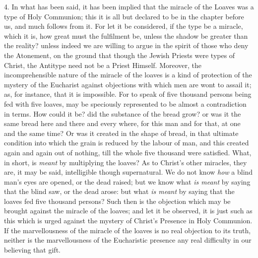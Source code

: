 4. In what has been said, it has been implied that the miracle of
the Loaves was a type of Holy Communion; this it is all but declared
to be in the chapter before us, and much follows from it. For let it
be considered, if the type be a miracle, which it is, how great must
the fulfilment be, unless the shadow be greater than the reality?
unless indeed we are willing to argue in the spirit of those who deny
the Atonement, on the ground that though the Jewish Priests were types
of Christ, the Antitype need not be a Priest Himself. Moreover, the
incomprehensible nature of the miracle of the loaves is a kind of
protection of the mystery of the Eucharist against objections with
which men are wont to assail it; as, for instance, that it is
impossible. For to speak of five thousand persons being fed with five
loaves, may be speciously represented to be almost a contradiction in
terms. How could it be? did the substance of the bread grow? or was it
the same bread here and there and every where, for this man and for
that, at one and the same time? Or was it created in the shape of
bread, in that ultimate condition into which the grain is reduced by
the labour of man, and this created again and again out of nothing,
till the whole five thousand were satisfied. What, in short, is \emph{meant}
by multiplying the loaves? As to Christ's other miracles, they are, it
may be said, intelligible though supernatural. We do not know \emph{how}
a blind man's eyes are opened, or the dead raised; but we know what \emph{is
meant} by saying that the blind saw, or the dead arose: but what \emph{is
meant} by saying that the loaves fed five thousand persons? Such
then is the objection which may be brought against the miracle of the
loaves; and let it be observed, it is just such as this which is urged
against the mystery of Christ's Presence in Holy Communion. If the
marvellousness of the miracle of the loaves is no real objection to
its truth, neither is the marvellousness of the Eucharistic presence
any real difficulty in our believing that gift.

